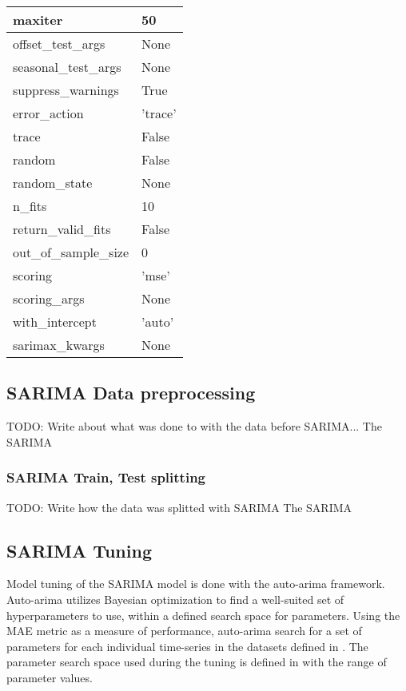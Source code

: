 \begin{table}[h]
\begin{tabular}{|l|l|}
    maxiter                & 50      \\ \hline
    offset\_test\_args     & None    \\ \hline
    seasonal\_test\_args   & None    \\ \hline
    suppress\_warnings     & True    \\ \hline
    error\_action          & 'trace' \\ \hline
    trace                  & False   \\ \hline
    random                 & False   \\ \hline
    random\_state          & None    \\ \hline
    n\_fits                & 10      \\ \hline
    return\_valid\_fits    & False   \\ \hline
    out\_of\_sample\_size  & 0       \\ \hline
    scoring                & 'mse'   \\ \hline
    scoring\_args          & None    \\ \hline
    with\_intercept        & 'auto'  \\ \hline
    sarimax\_kwargs        & None    \\ \hline
  \end{tabular}
\end{table}

\subsection{SARIMA Data preprocessing}
TODO: Write about what was done to with the data before SARIMA...
The SARIMA
\subsubsection{SARIMA Train, Test splitting}
TODO: Write how the data was splitted with SARIMA
The SARIMA

\subsection{SARIMA Tuning}
Model tuning of the SARIMA model is done with the auto-arima framework.
Auto-arima utilizes Bayesian optimization to find a well-suited set of hyperparameters to use,
within a defined search space for parameters.
Using the MAE metric as a measure of performance, auto-arima search for a set of parameters for each individual time-series
in the datasets defined in .
The parameter search space used during the tuning is defined in  with the range of parameter values.

